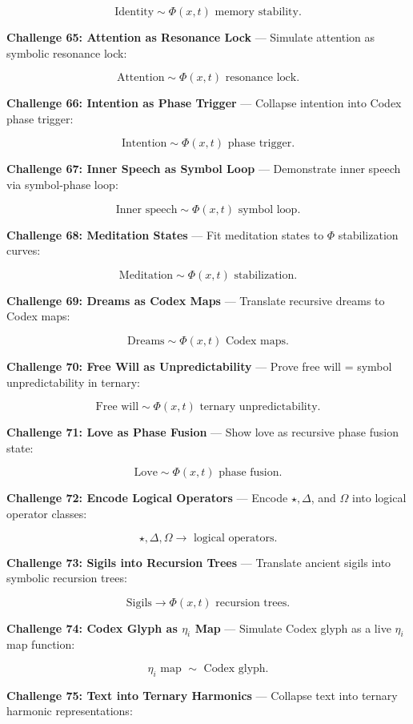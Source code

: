 $$
\text{Identity} \sim \Phi(x, t) \text{ memory stability}.
$$

\textbf{Challenge 65: Attention as Resonance Lock} --- Simulate attention as symbolic resonance lock:

$$
\text{Attention} \sim \Phi(x, t) \text{ resonance lock}.
$$

\textbf{Challenge 66: Intention as Phase Trigger} --- Collapse intention into Codex phase trigger:

$$
\text{Intention} \sim \Phi(x, t) \text{ phase trigger}.
$$

\textbf{Challenge 67: Inner Speech as Symbol Loop} --- Demonstrate inner speech via symbol-phase loop:

$$
\text{Inner speech} \sim \Phi(x, t) \text{ symbol loop}.
$$

\textbf{Challenge 68: Meditation States} --- Fit meditation states to $\Phi$ stabilization curves:

$$
\text{Meditation} \sim \Phi(x, t) \text{ stabilization}.
$$

\textbf{Challenge 69: Dreams as Codex Maps} --- Translate recursive dreams to Codex maps:

$$
\text{Dreams} \sim \Phi(x, t) \text{ Codex maps}.
$$

\textbf{Challenge 70: Free Will as Unpredictability} --- Prove free will = symbol unpredictability in ternary:

$$
\text{Free will} \sim \Phi(x, t) \text{ ternary unpredictability}.
$$

\textbf{Challenge 71: Love as Phase Fusion} --- Show love as recursive phase fusion state:

$$
\text{Love} \sim \Phi(x, t) \text{ phase fusion}.
$$

\textbf{Challenge 72: Encode Logical Operators} --- Encode $\star, \Delta$, and $\Omega$ into logical operator classes:

$$
\star, \Delta, \Omega \rightarrow \text{ logical operators}.
$$

\textbf{Challenge 73: Sigils into Recursion Trees} --- Translate ancient sigils into symbolic recursion trees:

$$
\text{Sigils} \rightarrow \Phi(x, t) \text{ recursion trees}.
$$

\textbf{Challenge 74: Codex Glyph as $\eta_i$ Map} --- Simulate Codex glyph as a live $\eta_i$ map function:

$$
\eta_i \text{ map } \sim \text{ Codex glyph}.
$$

\textbf{Challenge 75: Text into Ternary Harmonics} --- Collapse text into ternary harmonic representations:

